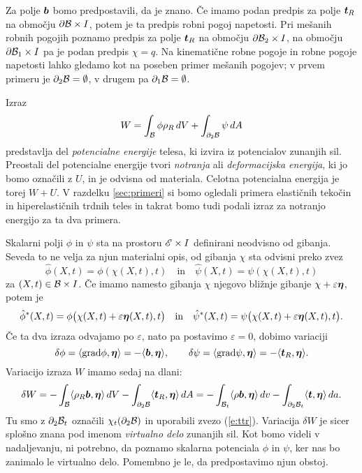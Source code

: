 Za polje $\boldsymbol b$ bomo predpostavili, da je znano.
Če imamo podan predpis za polje $\boldsymbol t_R$ na območju $\partial\mathcal B\times I$, potem je ta predpis
robni pogoj napetosti. Pri mešanih robnih pogojih poznamo predpis za polje $\boldsymbol t_R$ na
območju $\partial\mathcal B_2\times I$, na območju $\partial\mathcal B_1\times I$ pa je podan predpis $\chi=q$.
Na kinematične robne pogoje in robne pogoje napetosti lahko gledamo kot na poseben
primer mešanih pogojev; v prvem primeru je $\partial_2\mathcal B=\emptyset$, v drugem pa
$\partial_1\mathcal B=\emptyset$.

Izraz
\begin{equation*}
	W = \int_{\mathcal B}\phi\rho_R\, dV + \int_{\partial_2 \mathcal B}\psi\, dA
\end{equation*}
predstavlja del \emph{potencialne energije} telesa, ki izvira iz potencialov zunanjih sil.
Preostali del potencialne energije tvori \emph{notranja} ali \emph{deformacijska energija},
ki jo bomo označili z $U$, in je odvisna od materiala. Celotna potencialna energija je torej $W+U$.
V razdelku \ref{sec:primeri} si bomo ogledali primera
elastičnih tekočin in hiperelastičnih trdnih teles in takrat bomo tudi podali izraz
za notranjo energijo za ta dva primera.


Skalarni polji $\phi$ in $\psi$ sta na prostoru $\mathscr E\times I$ definirani neodvisno od gibanja.
Seveda to ne velja za njun materialni opis, od gibanja $\chi$ sta odvisni preko zvez
\[ \hat{\phi}(X,t)=\phi(\chi(X,t),t)\quad\textrm{in}\quad\hat{\psi}(X,t)=\psi(\chi(X,t),t) \]
za $(X,t)\in \mathcal B\times I$.
Če imamo namesto gibanja $\chi$ njegovo bližnje gibanje $\chi+\varepsilon\boldsymbol \eta$, potem je
\[
	\hat{\phi}^*(X,t)=\phi\big(\chi(X,t)+\varepsilon\boldsymbol \eta(X,t),t\big)\quad\textrm{in}
	\quad\hat{\psi}^*(X,t)=\psi\big(\chi(X,t)+\varepsilon\boldsymbol \eta(X,t),t\big).
\]
Če ta dva izraza odvajamo po $\varepsilon$, nato pa postavimo $\varepsilon=0$, dobimo variaciji
\[
	\delta\phi=\langle\mathrm{grad}\phi,\boldsymbol \eta\rangle=-\langle\boldsymbol b,\boldsymbol \eta\rangle,\qquad
	\delta\psi=\langle\mathrm{grad}\psi,\boldsymbol \eta\rangle=-\langle\boldsymbol t_R,\boldsymbol \eta\rangle.
\]
Variacijo izraza $W$ imamo sedaj na dlani:
\begin{equation} \label{e:varvide}
	\delta W = -\int_{\mathcal B}\langle\rho_R\boldsymbol b,\boldsymbol \eta\rangle\, dV
	- \int_{\partial_2 \mathcal B}\langle\boldsymbol t_R,\boldsymbol \eta\rangle\, dA=
	-\int_{\mathcal B_t}\langle\rho\boldsymbol b,\boldsymbol \eta\rangle\, dv
	- \int_{\partial_2 \mathcal B_t}\langle\boldsymbol t,\boldsymbol \eta\rangle\, da.
\end{equation}
Tu smo z $\partial_2 \mathcal B_t$ označili $\chi_t(\partial_2 \mathcal B)$ in uporabili zvezo (\ref{e:ttr}).
Variacija $\delta W$ je sicer splošno znana
pod imenom \emph{virtualno delo} zunanjih sil. Kot bomo videli v nadaljevanju,
ni potrebno, da poznamo skalarna potenciala $\phi$ in $\psi$, ker nas bo zanimalo le virtualno delo.
Pomembno je le, da predpostavimo njun obstoj.


